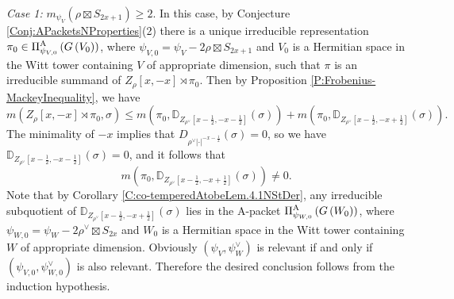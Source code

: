 \documentclass[11pt,letterpaper]{amsart}
\theoremstyle{plain}
\numberwithin{theorem}{section}
\numberwithin{equation}{subsection}
\theoremstyle{remark}
\newcommand{\D}{\mathbb{D}}
\def\AP{\Pi^{\rm A}} %
\begin{document}
\emph{Case 1:} $m_{\psi_V}\left(\rho \boxtimes S_{2x+1}\right)\geq 2$. In this case, by Conjecture \ref{Conj:APacketsNProperties}(2) there is a unique irreducible representation $\pi_0\in\AP_{\psi_{V,0}}\left(G\left(V_0\right)\right)$, where $\psi_{V,0}=\psi_V-2\rho\boxtimes S_{2x+1}$ and $V_0$ is a Hermitian space in the Witt tower containing $V$ of appropriate dimension, such that $\pi$ is an irreducible summand of $Z_\rho\left[x,-x\right]\rtimes \pi_0$.
Then by Proposition \ref{P:Frobenius-MackeyInequality}, we have
\[
    m\left(Z_\rho\left[x,-x\right]\rtimes \pi_0, \sigma\right) \leq m\left(\pi_0,\D_{Z_{\rho^\vee}\left[x-\frac{1}{2},-x-\frac{1}{2}\right]}\left(\sigma\right)\right) + m\left(\pi_0, \D_{Z_{\rho^\vee}\left[x-\frac{1}{2},-x+\frac{1}{2}\right]}\left(\sigma\right)\right).
\]
The minimality of $-x$ implies that $D_{\rho^\vee|\cdot|^{-x-\frac{1}{2}}}\left(\sigma\right) =0$, so we have $\D_{Z_{\rho^\vee}\left[x-\frac{1}{2},-x-\frac{1}{2}\right]}\left(\sigma\right)= 0$, and it follows that
\[
    m\left(\pi_0, \D_{Z_{\rho^\vee}\left[x-\frac{1}{2},-x+\frac{1}{2}\right]}\left(\sigma\right)\right) \neq 0.
\]
Note that by Corollary \ref{C:co-temperedAtobeLem.4.1NStDer}, any irreducible subquotient of $\D_{Z_{\rho^\vee}\left[x-\frac{1}{2},-x+\frac{1}{2}\right]}\left(\sigma\right)$ lies in the A-packet $\AP_{\psi_{W,0}}\left(G\left(W_0\right)\right)$, where $\psi_{W,0}=\psi_W-2\rho^\vee\boxtimes S_{2x}$ and $W_0$ is a Hermitian space in the Witt tower containing $W$ of appropriate dimension.
Obviously $\left(\psi_V,\psi_W^\vee\right)$ is relevant if and only if $\left(\psi_{V,0},\psi_{W,0}^\vee\right)$ is also relevant. Therefore the desired conclusion follows from the induction hypothesis. 

\vskip 5pt
\end{document}
